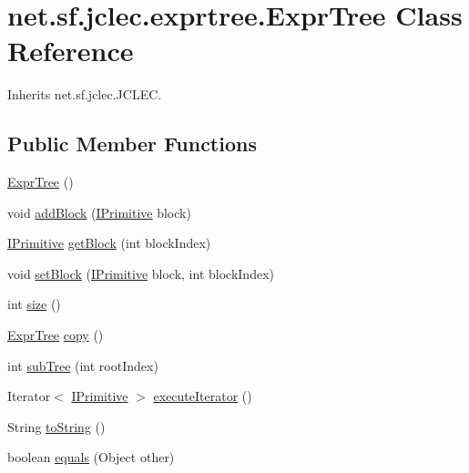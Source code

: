\hypertarget{classnet_1_1sf_1_1jclec_1_1exprtree_1_1_expr_tree}{\section{net.\-sf.\-jclec.\-exprtree.\-Expr\-Tree Class Reference}
\label{classnet_1_1sf_1_1jclec_1_1exprtree_1_1_expr_tree}
}


Inherits net.\-sf.\-jclec.\-J\-C\-L\-E\-C.

\subsection*{Public Member Functions}
\begin{DoxyCompactItemize}
\item 
\hyperlink{classnet_1_1sf_1_1jclec_1_1exprtree_1_1_expr_tree_a85c2c8dfa902edb3aa5072222b990bda}{Expr\-Tree} ()
\item 
void \hyperlink{classnet_1_1sf_1_1jclec_1_1exprtree_1_1_expr_tree_afe0d2782c07ec7535af397f988e498cf}{add\-Block} (\hyperlink{interfacenet_1_1sf_1_1jclec_1_1exprtree_1_1_i_primitive}{I\-Primitive} block)
\item 
\hyperlink{interfacenet_1_1sf_1_1jclec_1_1exprtree_1_1_i_primitive}{I\-Primitive} \hyperlink{classnet_1_1sf_1_1jclec_1_1exprtree_1_1_expr_tree_a1dce5503763804028585f66df548fb57}{get\-Block} (int block\-Index)
\item 
void \hyperlink{classnet_1_1sf_1_1jclec_1_1exprtree_1_1_expr_tree_af746344b2364363781a393238e6ec81a}{set\-Block} (\hyperlink{interfacenet_1_1sf_1_1jclec_1_1exprtree_1_1_i_primitive}{I\-Primitive} block, int block\-Index)
\item 
int \hyperlink{classnet_1_1sf_1_1jclec_1_1exprtree_1_1_expr_tree_ace3e27d755f5eb9f8085f418f17b8bf4}{size} ()
\item 
\hyperlink{classnet_1_1sf_1_1jclec_1_1exprtree_1_1_expr_tree}{Expr\-Tree} \hyperlink{classnet_1_1sf_1_1jclec_1_1exprtree_1_1_expr_tree_aa045415684bf4b6561c4f9181a5bd51c}{copy} ()
\item 
int \hyperlink{classnet_1_1sf_1_1jclec_1_1exprtree_1_1_expr_tree_a382dcb6253aa6413996360a4f06f112f}{sub\-Tree} (int root\-Index)
\item 
Iterator$<$ \hyperlink{interfacenet_1_1sf_1_1jclec_1_1exprtree_1_1_i_primitive}{I\-Primitive} $>$ \hyperlink{classnet_1_1sf_1_1jclec_1_1exprtree_1_1_expr_tree_a217aa20e10a46a89e0a1a1d5d12abd63}{execute\-Iterator} ()
\item 
String \hyperlink{classnet_1_1sf_1_1jclec_1_1exprtree_1_1_expr_tree_a4123b9cc1de989e37815c1d229b00528}{to\-String} ()
\item 
boolean \hyperlink{classnet_1_1sf_1_1jclec_1_1exprtree_1_1_expr_tree_ac3efbfd612ef016a6a028f426530ea53}{equals} (Object other)
\end{DoxyCompactItemize}


